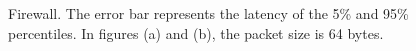 \begin{figure}[htbp]
	\centering
	\hspace{1pt}
	
	\caption{Firewall. The error bar represents the latency of the 5\% and 95\% percentiles. In figures (a) and (b), the packet size is 64 bytes.}
	
	\label{clicknp:fig:firewall}
\end{figure}

